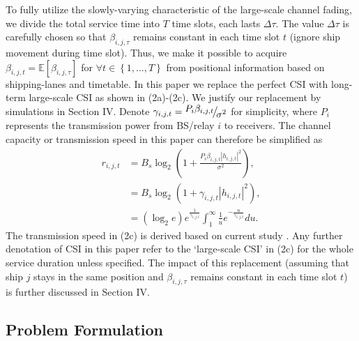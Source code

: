 \documentclass[conference]{IEEEtran}
\begin{document}
 To fully utilize the slowly-varying characteristic of the large-scale channel fading, we divide the total service time into $T$ time slots, each lasts $\Delta \tau$. The value $\Delta \tau$ is carefully chosen so that $\beta _{i,j,\tau }$ remains constant in each time slot $t$ (ignore ship movement during time slot). Thus, we make it possible to acquire $\beta _{i,j,t} = \mathbb{E} \left [ {\beta _{i,j,\tau }} \right ]$ for $\forall t \in \left\{ {1,...,T} \right\}$ from positional information based on shipping-lanes and timetable. 
 In this paper we replace the perfect CSI with long-term large-scale CSI as shown in (2a)-(2c). We justify our replacement by simulations in Section IV. Denote ${\gamma _{i,j,t }} = {\raise0.7ex\hbox{${{P_{i} }{\beta _{i,j,t }}}$} \!\mathord{\left/
  {\vphantom {{{P_{i} }{\beta _{i,j,t }}} {{\sigma ^2}}}}\right.\kern-\nulldelimiterspace}
 \!\lower0.7ex\hbox{${{\sigma ^2}}$}}$ for simplicity, where ${P_{i}}$ represents the transmission power from BS/relay $i$ to receivers. The channel capacity or transmission speed in this paper can therefore be simplified as
 \begin{subequations}
 \begin{align}
 {r_{i,j,t}} & = {{B_s}{{\log }_2}\left( {1 + \frac{{{P_{i} }{\beta _{i,j,t }}{{\left| {{h_{i,j,t }}} \right|}^2}}}{{{\sigma ^2}}}} \right)},\\
 & = {B_s}{\log }_2 \left( {1 + {\gamma _{i,j,t }}{{\left| {{h_{i,j,t }}} \right|}^2}} \right),\\
 & = \left( {{{\log }_2}e} \right){e^{\frac{1}{{{\gamma _{i,j,t }}}}}}\int_1^\infty {\frac{1}{u}{e^{ - \frac{u}{{{\gamma _{i,j,t }}}}}}du} .
 \end{align}
 \end{subequations}
 The transmission speed in (2c) is derived based on current study \cite{p41}. Any further denotation of CSI in this paper refer to the `large-scale CSI' in (2c) for the whole service duration unless specified. The impact of this replacement (assuming that ship $j$ stays in the same position and $\beta _{i,j,\tau }$ remains constant in each time slot $t$) is further discussed in Section IV. 
 
 \subsection{Problem Formulation}
 
\end{document}
